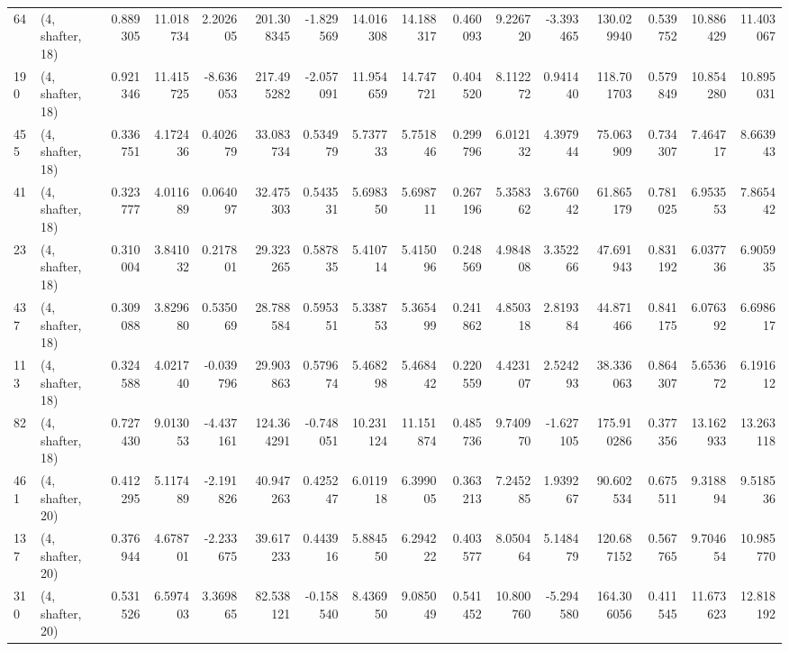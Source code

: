 \begin{tabular}{llrrrrrrrrrrrrrr}
64  &  (4, shafter, 18) &   0.889305 &  11.018734 &   2.202605 &   201.308345 &  -1.829569 &  14.016308 &  14.188317 &  0.460093 &   9.226720 &  -3.393465 &   130.029940 &   0.539752 &  10.886429 &  11.403067 \\
190 &  (4, shafter, 18) &   0.921346 &  11.415725 &  -8.636053 &   217.495282 &  -2.057091 &  11.954659 &  14.747721 &  0.404520 &   8.112272 &   0.941440 &   118.701703 &   0.579849 &  10.854280 &  10.895031 \\
455 &  (4, shafter, 18) &   0.336751 &   4.172436 &   0.402679 &    33.083734 &   0.534979 &   5.737733 &   5.751846 &  0.299796 &   6.012132 &   4.397944 &    75.063909 &   0.734307 &   7.464717 &   8.663943 \\
41  &  (4, shafter, 18) &   0.323777 &   4.011689 &   0.064097 &    32.475303 &   0.543531 &   5.698350 &   5.698711 &  0.267196 &   5.358362 &   3.676042 &    61.865179 &   0.781025 &   6.953553 &   7.865442 \\
23  &  (4, shafter, 18) &   0.310004 &   3.841032 &   0.217801 &    29.323265 &   0.587835 &   5.410714 &   5.415096 &  0.248569 &   4.984808 &   3.352266 &    47.691943 &   0.831192 &   6.037736 &   6.905935 \\
437 &  (4, shafter, 18) &   0.309088 &   3.829680 &   0.535069 &    28.788584 &   0.595351 &   5.338753 &   5.365499 &  0.241862 &   4.850318 &   2.819384 &    44.871466 &   0.841175 &   6.076392 &   6.698617 \\
113 &  (4, shafter, 18) &   0.324588 &   4.021740 &  -0.039796 &    29.903863 &   0.579674 &   5.468298 &   5.468442 &  0.220559 &   4.423107 &   2.524293 &    38.336063 &   0.864307 &   5.653672 &   6.191612 \\
82  &  (4, shafter, 18) &   0.727430 &   9.013053 &  -4.437161 &   124.364291 &  -0.748051 &  10.231124 &  11.151874 &  0.485736 &   9.740970 &  -1.627105 &   175.910286 &   0.377356 &  13.162933 &  13.263118 \\
461 &  (4, shafter, 20) &   0.412295 &   5.117489 &  -2.191826 &    40.947263 &   0.425247 &   6.011918 &   6.399005 &  0.363213 &   7.245285 &   1.939267 &    90.602534 &   0.675511 &   9.318894 &   9.518536 \\
137 &  (4, shafter, 20) &   0.376944 &   4.678701 &  -2.233675 &    39.617233 &   0.443916 &   5.884550 &   6.294222 &  0.403577 &   8.050464 &   5.148479 &   120.687152 &   0.567765 &   9.704654 &  10.985770 \\
310 &  (4, shafter, 20) &   0.531526 &   6.597403 &   3.369865 &    82.538121 &  -0.158540 &   8.436950 &   9.085049 &  0.541452 &  10.800760 &  -5.294580 &   164.306056 &   0.411545 &  11.673623 &  12.818192 \\

\end{tabular}
